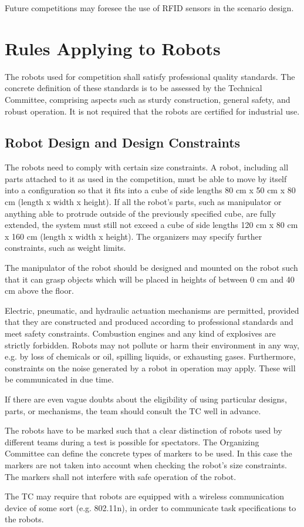Future competitions may foresee the use of RFID sensors in the scenario design.


\section{Rules Applying to Robots}
The robots used for competition shall satisfy professional quality standards. The concrete definition of these standards is to be assessed by the Technical Committee, comprising aspects such as sturdy construction, general safety, and robust operation. It is not required that the robots are certified for industrial use.

\subsection{Robot Design and Design Constraints}
The robots need to comply with certain size constraints. A robot, including all parts attached to it as used in the competition, must be able to move by itself into a configuration so that it fits into a cube of side lengths 80 cm x 50 cm x 80 cm (length x width x height). If all the robot’s parts, such as manipulator or anything able to protrude outside of the previously specified cube, are fully extended, the system must still not exceed a cube of side lengths 120 cm x 80 cm x 160 cm (length x width x height). The organizers may specify further constraints, such as weight limits. 
\par
The manipulator of the robot should be designed and mounted on the robot such that it can grasp objects which will be placed in heights of between 0 cm and 40 cm above the floor.
\par
Electric, pneumatic, and hydraulic actuation mechanisms are permitted, provided that they are constructed and produced according to professional standards and meet safety constraints. Combustion engines and any kind of explosives are strictly forbidden. Robots may not pollute or harm their environment in any way, e.g. by loss of chemicals or oil, spilling liquids, or exhausting gases. Furthermore, constraints on the noise generated by a robot in operation may apply. These will be communicated in due time.  
\par
If there are even vague doubts about the eligibility of using particular designs, parts, or mechanisms, the team should consult the TC well in advance.
\par
The robots have to be marked such that a clear distinction of robots used by different teams during a test is possible for spectators. The Organizing Committee can define the concrete types of markers to be used. In this case the markers are not taken into account when checking the robot’s size constraints. The markers shall not interfere with safe operation of the robot.
\par
The TC may require that robots are equipped with a wireless communication device of some sort (e.g. 802.11n), in order to communicate task specifications to the robots.

